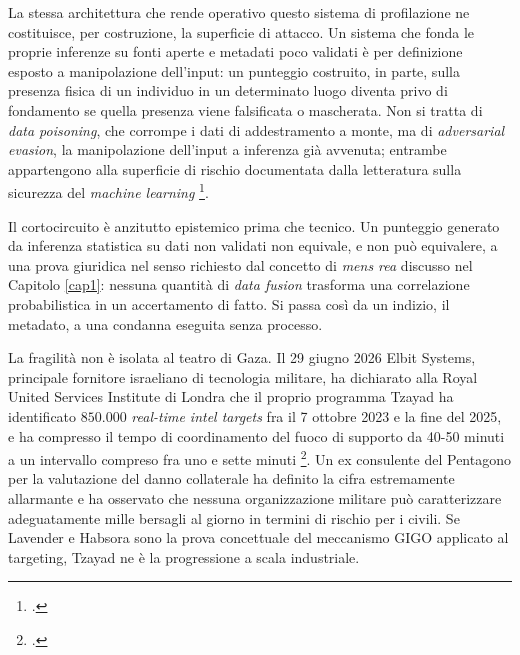 \documentclass[a4paper,12pt]{report}
\begin{document}
La stessa architettura che rende operativo questo sistema di profilazione ne
costituisce, per costruzione, la superficie di attacco. Un sistema che fonda le
proprie inferenze su fonti aperte e metadati poco validati è per definizione
esposto a manipolazione dell'input: un punteggio costruito, in parte, sulla
presenza fisica di un individuo in un determinato luogo diventa privo di
fondamento se quella presenza viene falsificata o mascherata. Non si tratta di
\textit{data poisoning}, che corrompe i dati di addestramento a monte, ma di
\textit{adversarial evasion}, la manipolazione dell'input a inferenza già
avvenuta; entrambe appartengono alla superficie di rischio documentata dalla
letteratura sulla sicurezza del \textit{machine learning}
\footcite{cina_2023_poisoning}.

Il cortocircuito è anzitutto epistemico prima che tecnico. Un punteggio generato
da inferenza statistica su dati non validati non equivale, e non può equivalere,
a una prova giuridica nel senso richiesto dal concetto di \textit{mens rea}
discusso nel Capitolo \ref{cap1}: nessuna quantità di \textit{data fusion}
trasforma una correlazione probabilistica in un accertamento di fatto. Si passa
così da un indizio, il metadato, a una condanna eseguita senza processo.

La fragilità non è isolata al teatro di Gaza. Il 29 giugno 2026 Elbit Systems,
principale fornitore israeliano di tecnologia militare, ha dichiarato alla Royal
United Services Institute di Londra che il proprio programma Tzayad ha
identificato $850.000$ \textit{real-time intel targets} fra il 7 ottobre 2023 e
la fine del 2025, e ha compresso il tempo di coordinamento del fuoco di supporto
da 40-50 minuti a un intervallo compreso fra uno e sette minuti
\footcite{guardian_2026_tzayad}. Un ex consulente del Pentagono per la valutazione
del danno collaterale ha definito la cifra estremamente allarmante e ha osservato
che nessuna organizzazione militare può caratterizzare adeguatamente mille
bersagli al giorno in termini di rischio per i civili. Se Lavender e Habsora sono
la prova concettuale del meccanismo GIGO applicato al targeting, Tzayad ne è la
progressione a scala industriale.
\end{document}
